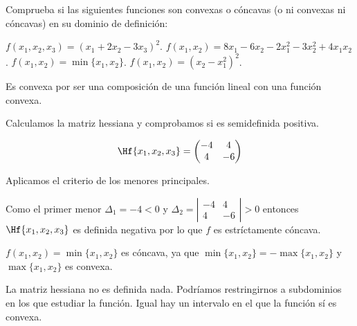 \begin{problem}[3]

\ex Comprueba si las siguientes funciones son convexas o cóncavas (o ni convexas ni cóncavas) en su dominio de definición:


\ppart $f(x_1,x_2,x_3)=(x_1+2x_2-3x_3)^2$.
\ppart $f(x_1,x_2)=8x_1-6x_2-2x_1^2-3x_2^2+4x_1x_2$.
\ppart $f(x_1,x_2)=\min\{x_1,x_2\}$.
\ppart $f(x_1,x_2)=(x_2-x_1^2)^2$.

\solution

\spart Es convexa por ser una composición de una función lineal con una función convexa.

\ppart Calculamos la matriz hessiana y comprobamos si es semidefinida positiva.

\[
\Hf{x_1,x_2,x_3} = \begin{pmatrix}	
-4&4\\4&-6
\end{pmatrix}
\]

Aplicamos el criterio de los menores principales.

Como el primer menor $\Delta_1 = -4 < 0$ y $\Delta_2 = \left|\begin{array}{cc}-4&4\\4&-6\end{array}\right| > 0$ entonces $\Hf{x_1,x_2,x_3}$ es definida negativa por lo que $f$ es estríctamente cóncava.


\ppart $f(x_1,x_2) = \min\{x_1,x_2\}$ es cóncava, ya que $\min\{x_1,x_2\} = -\max\{x_1,x_2\} $ y $\max\{x_1,x_2\}$ es convexa.

\ppart La matriz hessiana no es definida nada.
%
Podríamos restringirnos a subdominios en los que estudiar la función.
%
Igual hay un intervalo en el que la función sí es convexa.
\end{problem}


